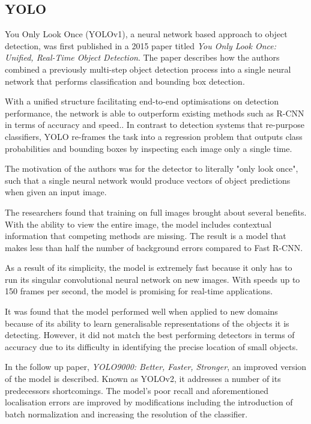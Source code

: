 \documentclass{thesis}
\begin{document}
\subsection{YOLO}

You Only Look Once (YOLOv1), a neural network based approach to object detection, was first published in a 2015 paper titled \textit{You Only Look Once: Unified, Real-Time Object Detection}. The paper describes how the authors combined a previously multi-step object detection process into a single neural network that performs classification and bounding box detection.

With a unified structure facilitating end-to-end optimisations on detection performance, the network is able to outperform existing methods such as R-CNN in terms of accuracy and speed.\cite{yolov1}. In contrast to detection systems that re-purpose classifiers, YOLO re-frames the task into a regression problem that outputs class probabilities and bounding boxes by inspecting each image only a single time. 

The motivation of the authors was for the detector to literally "only look once", such that a single neural network would produce vectors of object predictions when given an input image.

The researchers found that training on full images brought about several benefits. With the ability to view the entire image, the model includes contextual information that competing methods are missing\cite{frcnn}. The result is a model that makes less than half the number of background errors compared to Fast R-CNN\cite{yolov1}.

As a result of its simplicity, the model is extremely fast because it only has to run its singular convolutional neural network on new images. With speeds up to 150 frames per second\cite{yolov1}, the model is promising for real-time applications.

It was found that the model performed well when applied to new domains because of its ability to learn generalisable representations of the objects it is detecting. However, it did not match the best performing detectors in terms of accuracy due to its difficulty in identifying the precise location of small objects.

In the follow up paper, \textit{YOLO9000: Better, Faster, Stronger}, an improved version of the model is described. Known as YOLOv2, it addresses a number of its predecessors shortcomings. The model's poor recall and aforementioned localisation errors are improved by modifications including the introduction of batch normalization and increasing the resolution of the classifier\cite{yolo2}.
\end{document}
